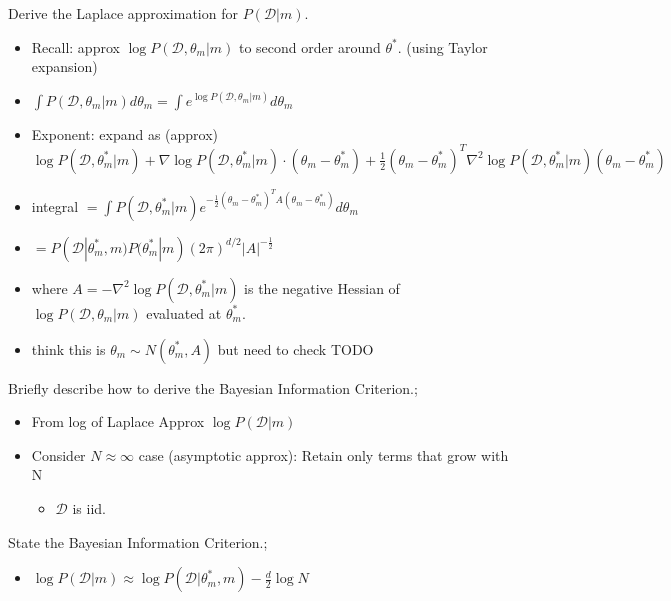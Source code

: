 \documentclass{article}
\begin{document}
Derive the Laplace approximation for $P(\mathcal{D}|m)$. \begin{itemize}
    \item Recall: approx $\log P(\mathcal{D},\theta_m|m)$ to second order around $\theta^*$. (using Taylor expansion)
    \item $\int P(\mathcal{D},\theta_m|m)d\theta_m = \int e^{\log P(\mathcal{D},\theta_m|m)}d\theta_m$
    \item Exponent: expand as (approx) $\log P(\mathcal{D},\theta^*_m|m) + \nabla \log P(\mathcal{D},\theta^*_m|m)\cdot (\theta_m-\theta_m^*)+\frac{1}{2}(\theta_m-\theta_m^*)^T\nabla^2\log P(\mathcal{D},\theta^*_m|m)(\theta_m-\theta_m^*)$
    \item integral $=\int P(\mathcal{D},\theta^*_m|m)e^{-\frac{1}{2}(\theta_m-\theta_m^*)^TA(\theta_m-\theta_m^*)}d\theta_m$
    \item $=P(\mathcal{D}|\theta^*_m, m)P(\theta^*_m|m)(2\pi)^{d/2}|A|^{-\frac{1}{2}}$
    \item where $A=-\nabla^2\log P(\mathcal{D},\theta^*_m|m)$ is the negative Hessian of $\log P(\mathcal{D},\theta_m|m)$ evaluated at $\theta^*_m$.
    \item think this is $\theta_m \sim N(\theta_m^*, A)$ but need to check TODO
\end{itemize}

Briefly describe how to derive the Bayesian Information Criterion.; \begin{itemize}
    \item From log of Laplace Approx $\log P(\mathcal{D}|m)$
    \item Consider $N\approx\infty$ case (asymptotic approx): Retain only terms that grow with N
    \begin{itemize}
        \item $\mathcal{D}$ is iid.
    \end{itemize}
\end{itemize}

State the Bayesian Information Criterion.; \begin{itemize}
    \item $\log P(\mathcal{D}|m)\approx \log P(\mathcal{D}|\theta^*_m, m)-\frac{d}{2}\log N$ 
\end{itemize}
\end{document}
